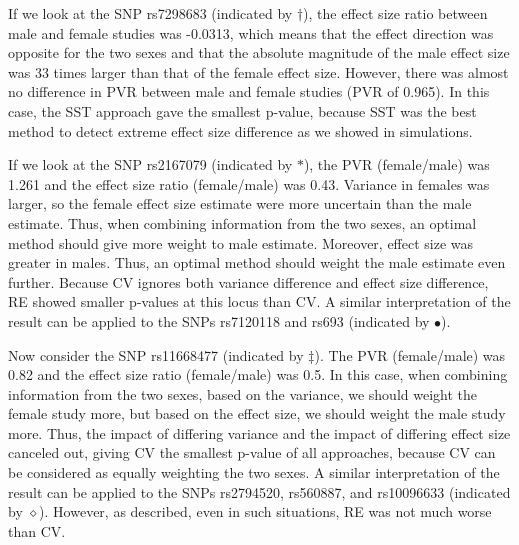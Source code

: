 \documentclass[11pt]{article}
\begin{document}
If we look at the SNP rs7298683 (indicated by $\dagger$), 
the effect size ratio between male and female studies was -0.0313, 
which means that the effect direction was opposite for the two sexes and that the absolute magnitude of 
the male effect size was 33 times larger than that of the female effect size.
However, there was almost no difference in PVR 
between male and 
female studies (PVR of 0.965). In this case, the SST approach gave the smallest p-value,
because SST was the best method to detect extreme effect size difference as we showed in simulations. %

If we look at the SNP rs2167079 (indicated by $\ast$), the PVR (female/male) was
1.261 and the effect size ratio (female/male) was 0.43.
Variance in females was larger, so the female effect size estimate were more uncertain than the male estimate.
Thus, when combining information from the two sexes, an optimal method should give more weight to male estimate.
Moreover, effect size was greater in males. Thus, an optimal method should weight the male estimate even further.
Because CV ignores both variance difference and effect size difference, RE showed smaller p-values at this locus than CV.
A similar interpretation of the result can be applied to the SNPs rs7120118 and rs693 (indicated by $\bullet$).

Now consider the SNP rs11668477 (indicated by $\ddagger$). 
The PVR (female/male) was
0.82 and the effect size ratio (female/male) was 0.5. 
In this case, when combining information from the two sexes,
based on the variance, we should weight the female study more, but based on the effect size, we should weight the male study more.
Thus, the impact of differing variance and the impact of differing effect size canceled out, giving CV the smallest p-value of all approaches, because CV can be considered as equally weighting the two sexes.
A similar interpretation of the result can be applied to the SNPs rs2794520, rs560887, 
and rs10096633 (indicated by $\diamond$).
However, as described, even in such situations, RE was not much worse than CV.
\end{document}
